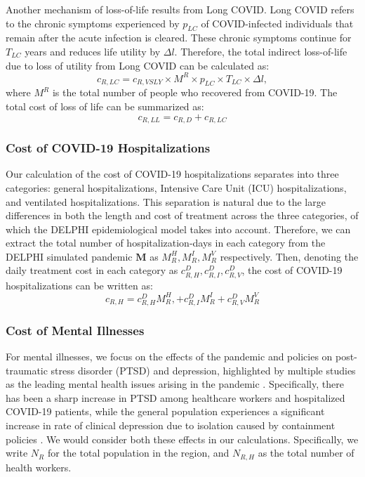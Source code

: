 \documentclass[msom,blindrev]{informs3} %
\begin{document}
Another mechanism of loss-of-life results from Long COVID. Long COVID refers to the chronic symptoms experienced by $p_{LC}$ of COVID-infected individuals that remain after the acute infection is cleared. These chronic symptoms continue for $T_{LC}$ years and reduces life utility by $\Delta l$. Therefore, the total indirect loss-of-life due to loss of utility from Long COVID can be calculated as:
\[c_{R,LC} = c_{R,VSLY} \times M^R \times p_{LC} \times T_{LC} \times \Delta l,\]
where $M^R$ is the total number of people who recovered from COVID-19. The total cost of loss of life can be summarized as:
\[c_{R,LL} = c_{R,D} + c_{R,LC}\]
\subsubsection*{Cost of COVID-19 Hospitalizations}
Our calculation of the cost of COVID-19 hospitalizations separates into three categories: general hospitalizations, Intensive Care Unit (ICU) hospitalizations, and ventilated hospitalizations. This separation is natural due to the large differences in both the length and cost of treatment across the three categories, of which the DELPHI epidemiological model takes into account. Therefore, we can extract the total number of hospitalization-days in each category from the DELPHI simulated pandemic $\bm{M}$ as $M^H_R, M^I_R, M^V_R$ respectively. Then, denoting the daily treatment cost in each category as $c^D_{R,H}, c^D_{R,I}, c^D_{R,V}$, the cost of COVID-19 hospitalizations can be written as:
\begin{equation}
    c_{R,H}=c^D_{R,H}M^H_R,+c^D_{R,I} M^I_R+c^D_{R,V} M^V_R
\end{equation}

\subsubsection*{Cost of Mental Illnesses}
For mental illnesses, we focus on the effects of the pandemic and policies on post-traumatic stress disorder (PTSD) and depression, highlighted by multiple studies as the leading mental health issues arising in the pandemic . Specifically, there has been a sharp increase in PTSD among healthcare workers and hospitalized COVID-19 patients, while the general population experiences a significant increase in rate of clinical depression due to isolation caused by containment policies . We would consider both these effects in our calculations. Specifically, we write $N_R$ for the total population in the region, and $N_{R,H}$ as the total number of health workers. 
\end{document}
